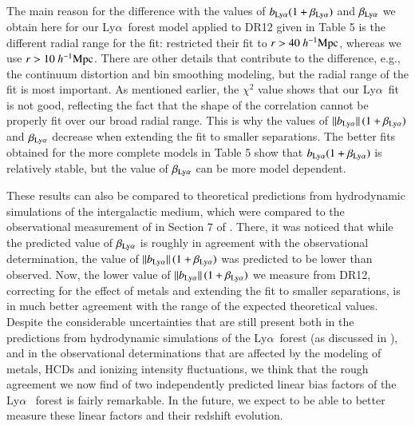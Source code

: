 \documentclass{aa}
\newcommand{\hMpc}{h^{-1}{\rm Mpc}}
\newcommand{\Lya}{Ly$\alpha$~}
\newcommand{\betalya}{\beta_{\rm Ly\alpha}}
\newcommand{\blya}{b_{\rm Ly\alpha}}
\begin{document}
   The main reason for the difference with the values of $\blya(1+\betalya)$ and
$\betalya$ we obtain here for our \Lya forest model applied to DR12 given in
Table 5 is the different radial range for the fit: \citet{2015JCAP...11..034B}
restricted their fit to $r>40~\hMpc$, whereas we use $r>10~\hMpc$. There are
other details that contribute to the difference, e.g., the continuum
distortion and bin smoothing modeling, but the radial range of the fit is
most important. As mentioned earlier, the $\chi^2$ value shows that our
\Lya fit is not good, reflecting the fact that the shape of the correlation
cannot be properly fit over our broad radial range. This is why
the values of $\|\blya\|\,(1+\betalya)$ and $\betalya$ decrease when extending
the fit to
smaller separations. The better fits obtained for the more complete models
in Table 5 show that $\blya(1+\betalya)$ is relatively stable, but the value of
$\betalya$ can be more model dependent.

   These results can also be compared to theoretical predictions from
hydrodynamic simulations of the intergalactic medium, which were
compared to the observational measurement of \citet{2015JCAP...11..034B} in
Section 7 of \citet{2015JCAP...12..017A}. There, it was noticed that
while the predicted value of $\betalya$ is roughly in agreement with the
observational determination, the value of $\|\blya\|\,(1+\betalya)$ was
predicted to
be lower than observed. Now, the lower value of $\|\blya\|\, (1+\betalya)$ we
measure
from DR12, correcting for the effect of metals and extending the fit
to smaller separations, is in much better agreement with the range of
the expected theoretical values. Despite the considerable uncertainties
that are still present both in the predictions from hydrodynamic
simulations of the \Lya forest (as discussed in \citet{2015JCAP...12..017A}),
and in the observational determinations
that are affected by the modeling of metals, HCDs and
ionizing intensity fluctuations, we think that the rough agreement we
now find of two independently predicted linear bias factors of the \Lya
forest is fairly remarkable. In the future, we expect to be able to
better measure these linear factors and their redshift evolution.





\end{document}
